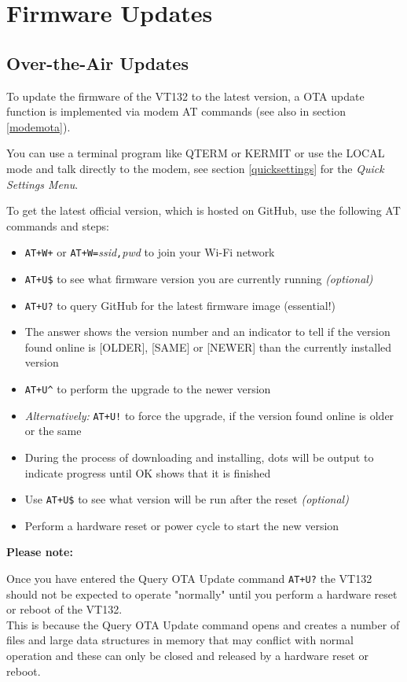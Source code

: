 \chapter{Firmware Updates}

\section{Over-the-Air Updates}

To update the firmware of the VT132 to the latest version, a OTA update function is implemented via modem
AT commands (see also in section \vref{modemota}).

You can use a terminal program like QTERM or KERMIT or use the LOCAL mode and talk directly to the modem, see
section \vref{quicksettings} for the \textit{Quick Settings Menu}. 

To get the latest official version, which is hosted on GitHub, use the following AT commands and steps:

\begin{itemize}[leftmargin=1em]
 \item \texttt{AT+W+} or \texttt{AT+W=}\textit{ssid}\texttt{,}\textit{pwd} to join your Wi-Fi network
 \item \texttt{AT+U\$} to see what firmware version you are currently running \textit{(optional)}
 \item \texttt{AT+U?} to query GitHub for the latest firmware image (essential!)
 \item The answer shows the version number and an indicator to tell if the version found online is
	[OLDER], [SAME] or [NEWER] than the currently installed version
 \item \texttt{AT+U\textasciicircum} to perform the upgrade to the newer version
 \item \textit{Alternatively:} \texttt{AT+U!} to force the upgrade, if the version found online is
	older or the same
 \item During the process of downloading and installing, dots will be output to indicate progress until OK shows
	that it is finished
 \item Use \texttt{AT+U\$} to see what version will be run after the reset \textit{(optional)}
 \item Perform a hardware reset or power cycle to start the new version
\end{itemize}

\textbf{Please note:}

Once you have entered the Query OTA Update command \texttt{AT+U?} the VT132 should not be expected to operate "normally"
until you perform a hardware reset or reboot of the VT132.\\
This is because the Query OTA Update command opens and creates a number of files and large data structures in memory
that may conflict with normal operation and these can only be closed and released by a hardware reset or reboot.

